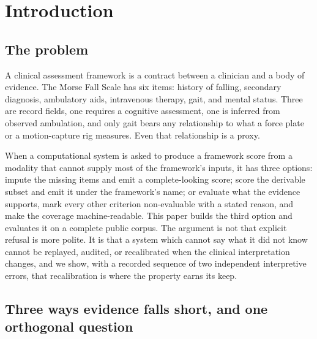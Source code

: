 \documentclass[11pt]{article}
\begin{document}
\begin{abstract}
evidence machinery, had Morse's category names baked in. The contribution is a methods artifact and a replayable record of a clinical interpretation being wrong, localized, corrected without tuning, wrong again for an independent reason, corrected again, and meeting a prespecified boundary of its own generality. Nothing here claims predictive validity or clinical use.
\end{abstract}

\section{Introduction}\label{introduction}

\subsection{The problem}\label{the-problem}

A clinical assessment framework is a contract between a clinician and a body of evidence. The Morse Fall Scale \citep{morse1989} has six items: history of falling, secondary diagnosis, ambulatory aids, intravenous therapy, gait, and mental status. Three are record fields, one requires a cognitive assessment, one is inferred from observed ambulation, and only gait bears any relationship to what a force plate or a motion-capture rig measures. Even that relationship is a proxy.

When a computational system is asked to produce a framework score from a modality that cannot supply most of the framework's inputs, it has three options: impute the missing items and emit a complete-looking score; score the derivable subset and emit it under the framework's name; or evaluate what the evidence supports, mark every other criterion non-evaluable with a stated reason, and make the coverage machine-readable. This paper builds the third option and evaluates it on a complete public corpus. The argument is not that explicit refusal is more polite. It is that a system which cannot say what it did not know cannot be replayed, audited, or recalibrated when the clinical interpretation changes, and we show, with a recorded sequence of two independent interpretive errors, that recalibration is where the property earns its keep.

\subsection{Three ways evidence falls short, and one orthogonal question}\label{three-ways-evidence-falls-short-and-one-orthogonal-question}
\end{document}
